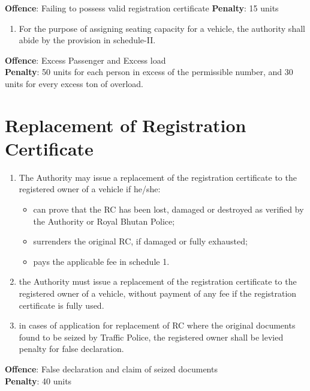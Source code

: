 \documentclass[
]{book}
\providecommand{\tightlist}{%
  \setlength{\itemsep}{0pt}\setlength{\parskip}{0pt}}
\begin{document}
\textbf{Offence}: Failing to possess valid registration certificate
\textbf{Penalty}: 15 units

\begin{enumerate}
\def\labelenumi{\alph{enumi}.}
\setcounter{enumi}{4}
\tightlist
\item
  For the purpose of assigning seating capacity for a vehicle, the authority shall abide by the provision in schedule-II.
\end{enumerate}

\textbf{Offence}: Excess Passenger and Excess load\\
\textbf{Penalty}: 50 units for each person in excess of the permissible number, and 30 units for every excess ton of overload.

\hypertarget{replacement-of-registration-certificate}{%
\section{Replacement of Registration Certificate}\label{replacement-of-registration-certificate}}

\begin{enumerate}
\def\labelenumi{\alph{enumi}.}
\tightlist
\item
  The Authority may issue a replacement of the registration certificate to the registered owner of a vehicle if he/she:

  \begin{itemize}
  \tightlist
  \item
    can prove that the RC has been lost, damaged or destroyed as verified by the Authority or Royal Bhutan Police;
  \item
    surrenders the original RC, if damaged or fully exhausted;
  \item
    pays the applicable fee in schedule 1.
  \end{itemize}
\item
  the Authority must issue a replacement of the registration certificate to the registered owner of a vehicle, without payment of any fee if the registration certificate is fully used.
\item
  in cases of application for replacement of RC where the original documents found to be seized by Traffic Police, the registered owner shall be levied penalty for false declaration.
\end{enumerate}

\textbf{Offence}: False declaration and claim of seized documents\\
\textbf{Penalty}: 40 units
\end{document}

